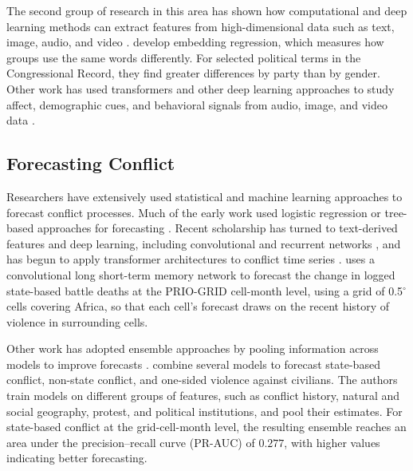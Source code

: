 \documentclass[11pt, letterpaper]{article}
\begin{document}
The second group of research in this area has shown how computational and deep learning methods can extract features from high-dimensional data such as text, image, audio, and video \citep{dietrich2019pitch, tarr2023automated, zhang2019casm, knox2021dynamic}. \cite{rodriguez2023embedding} develop embedding regression, which measures how groups use the same words differently. For selected political terms in the Congressional Record, they find greater differences by party than by gender. Other work has used transformers and other deep learning approaches to study affect, demographic cues, and behavioral signals from audio, image, and video data \citep{mestre2026audio, jeon2026faces, wu2022marmot}.
\subsection{Forecasting Conflict}
Researchers have extensively used statistical and machine learning approaches to forecast conflict processes. Much of the early work used logistic regression or tree-based approaches for forecasting \citep{goldstone2010pitf, ward2010perils, muchlinski2016comparing, blair2020forecasting, hegre2019views}. %
Recent scholarship has turned to text-derived features \citep{mueller2018reading} and deep learning, including convolutional and recurrent networks \citep{radford2022highres}, and has begun to apply transformer architectures to conflict time series \citep{walterskirchen2024tft}. \cite{radford2022highres} uses a convolutional long short-term memory network to forecast the change in logged state-based battle deaths at the PRIO-GRID cell-month level, using a grid of 0.5$^\circ$ cells covering Africa, so that each cell's forecast draws on the recent history of violence in surrounding cells.

Other work has adopted ensemble approaches by pooling information across models to improve forecasts \citep{beger2014irregular, montgomery2012ebma, vesco2022united}. \cite{hegre2019views} combine several models to forecast state-based conflict, non-state conflict, and one-sided violence against civilians. The authors train models on different groups of features, such as conflict history, natural and social geography, protest, and political institutions, and pool their estimates. For state-based conflict at the grid-cell-month level, the resulting ensemble reaches an area under the precision--recall curve (PR-AUC) of $0.277$, with higher values indicating better forecasting.
\end{document}
